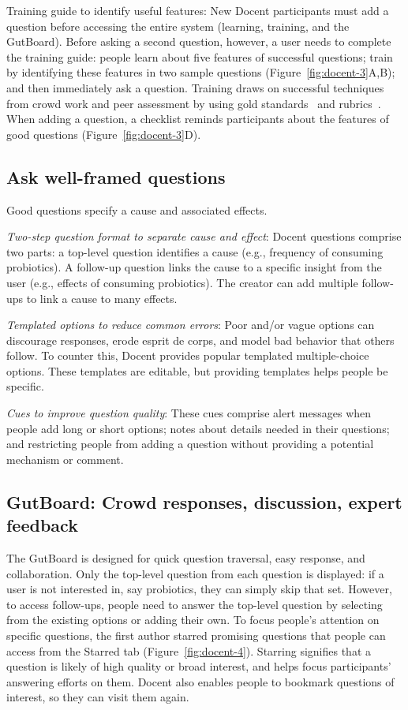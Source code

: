 Training guide to identify useful features: New Docent participants must add a question before accessing the entire system (learning, training, and the GutBoard). Before asking a second question, however, a user needs to complete the training guide: people learn about five features of successful questions; train by identifying these features in two sample questions (Figure~\ref{fig:docent-3}A,B); and then immediately ask a question. Training draws on successful techniques from crowd work and peer assessment by using gold standards~\cite{Kittur2013} and rubrics~\cite{Andrade2005}. When adding a question, a checklist reminds participants about the features of good questions (Figure~\ref{fig:docent-3}D).

\subsection{Ask well-framed questions }
Good questions specify a cause and associated effects.

\textit{Two-step question format to separate cause and effect}: Docent questions comprise two parts: a top-level question identifies a cause (e.g., frequency of consuming probiotics). A follow-up question links the cause to a specific insight from the user (e.g., effects of consuming probiotics). The creator can add multiple follow-ups to link a cause to many effects.

\textit{Templated options to reduce common errors}: Poor and/or vague options can discourage responses, erode esprit de corps, and model bad behavior that others follow. To counter this, Docent provides popular templated multiple-choice options. These templates are editable, but providing templates helps people be specific.

\textit{Cues to improve question quality}: These cues comprise alert messages when people add long or short options; notes about details needed in their questions; and restricting people from adding a question without providing a potential mechanism or comment.

\subsection{GutBoard: Crowd responses, discussion, expert feedback}
The GutBoard is designed for quick question traversal, easy response, and collaboration. Only the top-level question from each question is displayed: if a user is not interested in, say probiotics, they can simply skip that set. However, to access follow-ups, people need to answer the top-level question by selecting from the existing options or adding their own. To focus people’s attention on specific questions, the first author starred promising questions that people can access from the Starred tab (Figure~\ref{fig:docent-4}). Starring signifies that a question is likely of high quality or broad interest, and helps focus participants’ answering efforts on them. Docent also enables people to bookmark questions of interest, so they can visit them again. 

